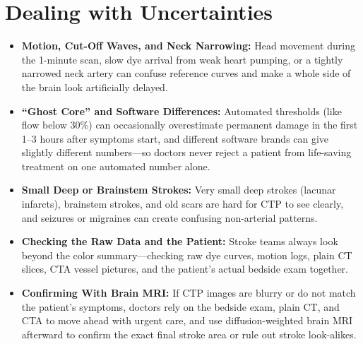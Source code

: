 \section{Dealing with Uncertainties}
\begin{itemize}
    \item \textbf{Motion, Cut-Off Waves, and Neck Narrowing:} Head movement during the 1-minute scan, slow dye arrival from weak heart pumping, or a tightly narrowed neck artery can confuse reference curves and make a whole side of the brain look artificially delayed.
    \item \textbf{``Ghost Core'' and Software Differences:} Automated thresholds (like flow below 30\%) can occasionally overestimate permanent damage in the first 1--3 hours after symptoms start, and different software brands can give slightly different numbers---so doctors never reject a patient from life-saving treatment on one automated number alone.
    \item \textbf{Small Deep or Brainstem Strokes:} Very small deep strokes (lacunar infarcts), brainstem strokes, and old scars are hard for CTP to see clearly, and seizures or migraines can create confusing non-arterial patterns.
    \item \textbf{Checking the Raw Data and the Patient:} Stroke teams always look beyond the color summary---checking raw dye curves, motion logs, plain CT slices, CTA vessel pictures, and the patient's actual bedside exam together.
    \item \textbf{Confirming With Brain MRI:} If CTP images are blurry or do not match the patient's symptoms, doctors rely on the bedside exam, plain CT, and CTA to move ahead with urgent care, and use diffusion-weighted brain MRI afterward to confirm the exact final stroke area or rule out stroke look-alikes.
\end{itemize}


